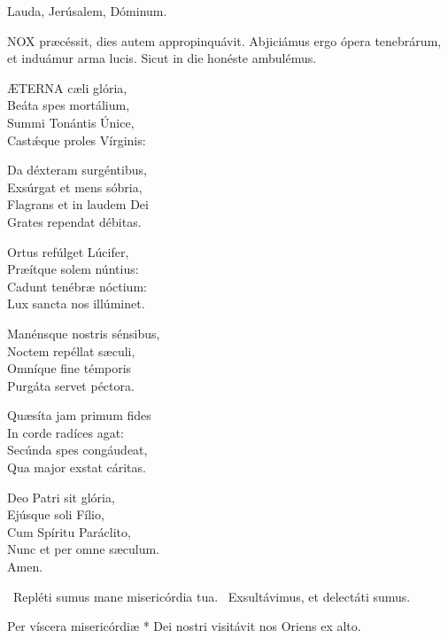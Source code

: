  Lauda, Jerúsalem, Dóminum.



\lettrine[lines=2]{N}{OX} præcéssit, dies autem appropinquávit. Abjiciámus ergo ópera tenebrárum, et induámur arma lucis. Sicut in die honéste ambulémus.


\lettrine[lines=2]{Æ}{TERNA} cæli glória,\\
Beáta spes mortálium,\\
Summi Tonántis Únice,\\
Castǽque proles Vírginis:

Da déxteram surgéntibus,\\
Exsúrgat et mens sóbria,\\
Flagrans et in laudem Dei\\
Grates rependat débitas.

Ortus refúlget Lúcifer,\\
Præítque solem núntius:\\
Cadunt tenébræ nóctium:\\
Lux sancta nos illúminet.

Manénsque nostris sénsibus,\\
Noctem repéllat sæculi,\\
Omníque fine témporis\\
Purgáta servet péctora.

Quæsíta jam primum fides\\
In corde radíces agat:\\
Secúnda spes congáudeat,\\
Qua major exstat cáritas.

Deo Patri sit glória,\\
Ejúsque soli Fílio,\\
Cum Spíritu Paráclito,\\
Nunc et per omne sæculum.\\
Amen.

\V\ Repléti sumus mane misericórdia tua. \R\ Exsultávimus, et delectáti sumus.

 Per víscera misericórdiæ * Dei nostri visitávit nos Oriens ex alto.



